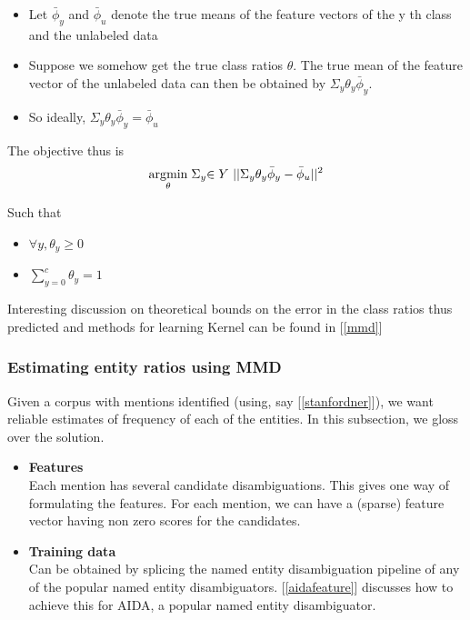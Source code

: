  \begin{itemize}
  \item Let $\bar{\phi}_y$ and $\bar{\phi}_u$ denote the true means of the feature vectors of the y th class and the
unlabeled data \medskip
  \item Suppose we somehow get the true class ratios ${\theta}$. The true mean of the feature vector of the
  unlabeled data can then be obtained by $\Sigma_y\theta_y\bar{\phi}_y$. \medskip
  \item So ideally, $\Sigma_y\theta_y\bar{\phi}_y = \bar{\phi}_u$ \medskip
 \end{itemize}
 The objective thus is
  \begin{equation}
  \underset{\theta}{\operatorname{arg}\!\operatorname{min}}\;\Sigma_y{ \in Y\text{  } }|| \Sigma_y\theta_y\bar{\phi}_y - \bar{\phi}_u || ^ {2}  
  \end{equation}
  \begin{center}
  Such that 
  \begin{itemize}
   \item \begin{center} $\forall y, \theta_y \geq 0$ \end{center}
  \item \begin{center} $\sum_{y = 0}^c \theta_y = 1$ \end{center} 
  \end{itemize}
  \end{center}
  

Interesting discussion on theoretical bounds on the error in the class ratios thus predicted and
methods for learning Kernel can be found in [\ref{mmd}]

\subsubsection{Estimating entity ratios using MMD}
Given a corpus with mentions identified (using, say [\ref{stanfordner}]), we want
reliable estimates of frequency of each of the entities. In this subsection, we gloss over the solution.
\begin{itemize}
\item \textbf{Features}  \\ Each mention has several candidate disambiguations. This gives one way of 
formulating the features. For each mention, we can have a (sparse) feature vector having non zero scores
for the candidates.
\item \textbf{Training data} \\ Can be obtained by splicing the named entity disambiguation pipeline of 
any of the popular named entity disambiguators. [\ref{aidafeature}] discusses how to achieve this for AIDA,
a popular named entity disambiguator. 
\end{itemize}




